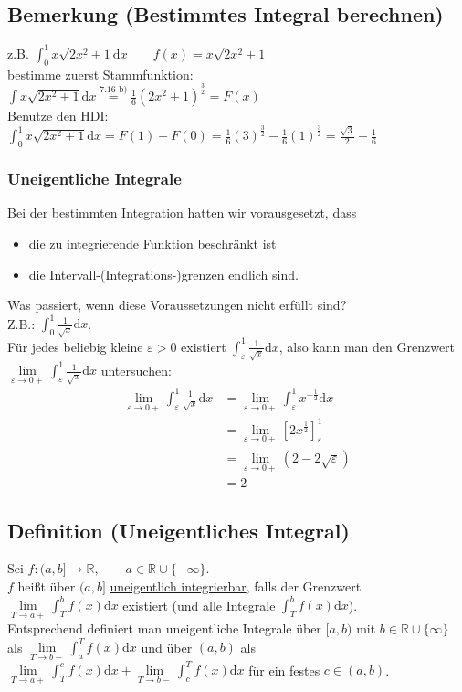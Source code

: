 \documentclass[12pt, titlepage]{article}
\newcommand{\R}{\mathds{R}}
\renewcommand{\>}{\rightarrow}
\renewcommand{\*}{\cdot}
\renewcommand{\epsilon}{\varepsilon}
\begin{document}
	\subsection{Bemerkung (Bestimmtes Integral berechnen)}
	z.B. $\int_{0}^{1}x\sqrt{2x^2+1}\textrm{d}x\qquad f(x)=x\sqrt{2x^2+1}$\\
	bestimme zuerst Stammfunktion:\\
	$\int x\sqrt{2x^2+1}\textrm{d}x\overset{\textrm{7.16 b)}}{=}\frac{1}{6}(2x^2+1)^{\frac{3}{2}}=F(x)$\\
	Benutze den HDI:\\
	$\int_{0}^{1}x\sqrt{2x^2+1}\textrm{d}x=F(1)-F(0)=\frac{1}{6}(3)^{\frac{3}{2}}-\frac{1}{6}(1)^{\frac{3}{2}}=\frac{\sqrt{3}}{2}-\frac{1}{6}$
	\subsubsection*{Uneigentliche Integrale}
	Bei der bestimmten Integration hatten wir vorausgesetzt, dass
	\begin{itemize}
		\item die zu integrierende Funktion beschränkt ist
		\item die Intervall-(Integrations-)grenzen endlich sind.
	\end{itemize}
	Was passiert, wenn diese Voraussetzungen nicht erfüllt sind?\\
	Z.B.: $\int_{0}^{1}\frac{1}{\sqrt{x}}\textrm{d}x$.\\
	Für jedes beliebig kleine $\epsilon>0$ existiert $\int_{\epsilon}^{1}\frac{1}{\sqrt{x}}\textrm{d}x$, also kann man den Grenzwert $\lim\limits_{\epsilon\>0+}\int_{\epsilon}^{1}\frac{1}{\sqrt{x}}\textrm{d}x$ untersuchen:
	\begin{align*}
		\lim\limits_{\epsilon\>0+}\int_{\epsilon}^{1}\frac{1}{\sqrt{x}}\textrm{d}x&=\lim\limits_{\epsilon\>0+}\int_{\epsilon}^{1}x^{-\frac{1}{2}}\textrm{d}x\\
		&=\lim\limits_{\epsilon\>0+}[2x^\frac{1}{2}]_\epsilon^1\\
		&=\lim\limits_{\epsilon\>0+}(2-2\sqrt{\epsilon})\\
		&=2
	\end{align*}
	\subsection{Definition (Uneigentliches Integral)}
	Sei $f\colon(a,b]\>\R,\qquad a\in\R\cup\{-\infty\}$.\\
	$f$ heißt über $(a,b]$ \underline{uneigentlich integrierbar}, falls der Grenzwert $\lim\limits_{T\>a+}\int_{T}^{b}f(x)\textrm{d}x$ existiert (und alle Integrale $\int_{T}^{b}f(x)\textrm{d}x$).\\
	Entsprechend definiert man uneigentliche Integrale über $[a,b)$ mit $b\in\R\cup\{\infty\}$ als $\lim\limits_{T\>b-}\int_{a}^{T}f(x)\textrm{d}x$ und über $(a,b)$ als $\lim\limits_{T\>a+}\int_{T}^{c}f(x)\textrm{d}x+\lim\limits_{T\>b-}\int_{c}^{T}f(x)\textrm{d}x$ für ein festes $c\in(a,b)$.
\end{document}
